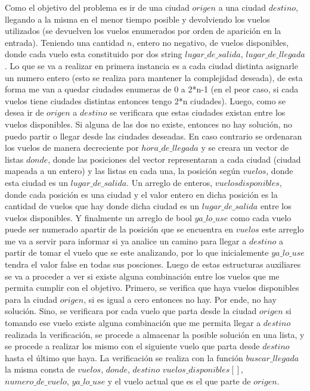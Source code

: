 \documentclass[a4paper]{article}
\begin{document}
Como el objetivo del problema es ir de una ciudad $origen$  a una ciudad $destino$,  llegando a la misma en el menor tiempo posible y devolviendo los vuelos utilizados (se devuelven los vuelos enumerados por orden de aparición en la entrada). Teniendo una cantidad $n$, entero no negativo, de vuelos disponibles, donde cada vuelo esta constituido por dos string $lugar\_de\_salida$, $lugar\_de\_llegada$. Lo que se va a realizar en primera instancia es a cada ciudad distinta asignarle un numero entero (esto se realiza para mantener la complejidad deseada),  de esta forma me van a quedar ciudades enumeras de 0 a 2*n-1 (en el peor caso, si cada vuelos tiene ciudades distintas entonces tengo 2*n ciudades). Luego, como se desea ir de $origen$ a $destino$ se verificara que estas ciudades existan entre los vuelos disponibles. Si alguna de las dos no existe, entonces no hay solución, no puedo partir o llegar desde las ciudades deseadas. En caso contrario se ordenaran los vuelos de manera decreciente por $hora\_de\_llegada$ y se creara un vector de listas $donde$, donde las posiciones del vector representaran a cada ciudad (ciudad mapeada a un entero) y las listas en cada una, la posición según $vuelos$, donde esta ciudad es un $lugar\_de\_salida$. Un arreglo de enteros, $vuelos disponibles$, donde cada posición es una ciudad y el valor entero en dicha posición es la cantidad de vuelos que hay donde dicha ciudad es un $lugar\_de\_salida$ entre los vuelos disponibles. Y finalmente un arreglo de bool $ya\_lo\_use$ como cada vuelo puede ser numerado apartir de la posición que se encuentra en $vuelos$ este arreglo me va a servir para informar si ya analice un camino para llegar a $destino$ a partir de tomar el vuelo que se este analizando, por lo que inicialemente $ya\_lo\_use$ tendra el valor false en todas sus posciones. Luego de estas estructuras auxiliares se va a proceder a ver si existe alguna combinación entre los vuelos que me permita cumplir con el objetivo. Primero, se verifica que haya vuelos disponibles para la ciudad $origen$, si es igual a cero entonces no hay. Por ende, no hay solución. Sino, se verificara por cada vuelo que parta desde la ciudad $origen$ si tomando ese vuelo existe alguna combinación que me permita llegar a $destino$ realizada la verificación, se procede  a almacenar la posible solución en una lista, y se procede a realizar los mismo con el siguiente vuelo que parta desde $destino$ hasta el último que haya. La verificación se realiza con la función  $buscar\_llegada$ la misma consta de $vuelos$, $donde$, $destino$ $vuelos\_disponibles[]$, $numero\_de\_vuelo$, $ya\_lo\_use$ y el vuelo actual que es el que parte de $origen$.
\end{document}
